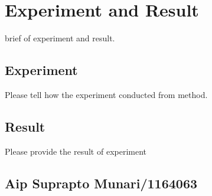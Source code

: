 \chapter{Experiment and Result}
brief of experiment and result.
\section{Experiment}
Please tell how the experiment conducted from method.

\section{Result}
Please provide the result of experiment

\section{Aip Suprapto Munari/1164063}

